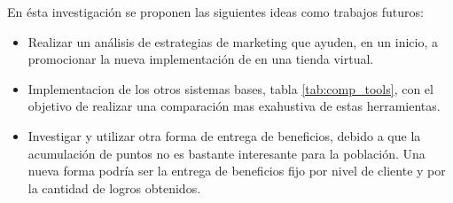 En ésta investigación se proponen las siguientes ideas como trabajos futuros:


\begin{itemize}

\item Realizar un análisis de estrategias de marketing que ayuden, en un inicio, a promocionar
la nueva implementación de {\gam} en una tienda virtual.

\item Implementacion de los otros sistemas bases, tabla \ref{tab:comp_tools}, con el objetivo de realizar una 
comparación mas exahustiva de estas herramientas.

\item Investigar y utilizar otra forma de entrega de beneficios, debido a que la
acumulación de puntos no es bastante interesante para la población. Una nueva forma podría ser la entrega
de beneficios fijo por nivel de cliente y por la cantidad de logros obtenidos.

\end{itemize}


